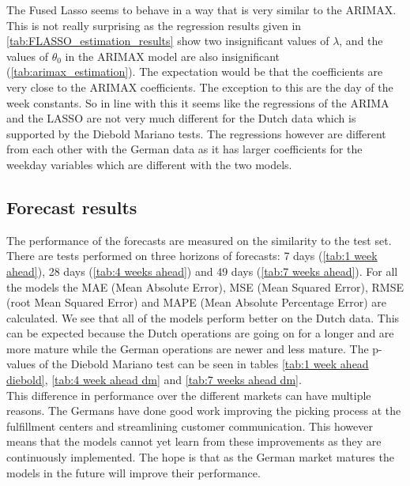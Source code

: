 The Fused Lasso seems to behave in a way that is very similar to the ARIMAX. This is not really surprising as the regression results given in \autoref{tab:FLASSO_estimation_results} show two insignificant values of $\lambda$, and the values of $\theta_0$ in the ARIMAX model are also insignificant (\autoref{tab:arimax_estimation}). The expectation would be that the coefficients are very close to the ARIMAX coefficients. The exception to this are the day of the week constants. So in line with this it seems like the regressions of the ARIMA and the LASSO are not very much different for the Dutch data which is supported by the Diebold Mariano tests. The regressions however are different from each other with the German data as it has larger coefficients for the weekday variables which are different with the two models.\\


\subsection{Forecast results}
\label{subsec:forecast_results}
The performance of the forecasts are measured on the similarity to the test set. There are tests performed on three horizons of forecasts: 7 days (\autoref{tab:1 week ahead}), 28 days (\autoref{tab:4 weeks ahead}) and 49 days (\autoref{tab:7 weeks ahead}). For all the models the MAE (Mean Absolute Error), MSE (Mean Squared Error), RMSE (root Mean Squared Error) and MAPE (Mean Absolute Percentage Error) are calculated. We see that all of the models perform better on the Dutch data. This can be expected because the Dutch operations are going on for a longer and are more mature while the German operations are newer and less mature. The p-values of the Diebold Mariano test can be seen in tables \ref{tab:1 week ahead diebold}, \ref{tab:4 week ahead dm} and \ref{tab:7 weeks ahead dm}.\\

This difference in performance over the different markets can have multiple reasons. The Germans have done good work improving the picking process at the fulfillment centers and streamlining customer communication. This however means that the models cannot yet learn from these improvements as they are continuously implemented. The hope is that as the German market matures the models in the future will improve their performance.\\


